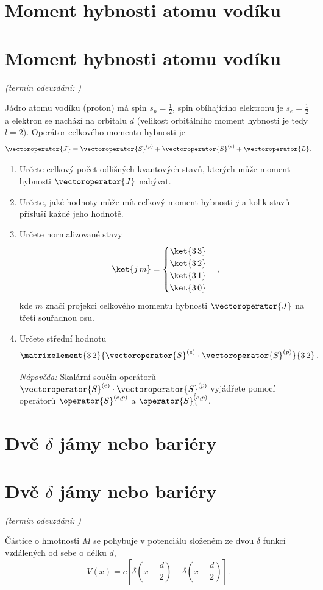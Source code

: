 \documentclass[a4paper,11pt,twoside]{book}
\def\np{\newpage}
\newcommand{\exercise}[2][]{\ifthenelse{\isempty{#1}}
	{\np\section{#2}}
	{\np\section{#2}\small{\it{(termín odevzdání: {#1})}\newline}}
}
\begin{document}
\exercise{Moment hybnosti atomu vodíku}
    Jádro atomu vodíku (proton) má spin $s_{p}=\frac{1}{2}$, spin obíhajícího elektronu je $s_{e}=\frac{1}{2}$ a elektron se nachází na orbitalu $d$ (velikost orbitálního moment hybnosti je tedy $l=2$).
    Operátor celkového momentu hybnosti je
    \begin{equation*}
        \vectoroperator{J}=\vectoroperator{S}^{(p)}+\vectoroperator{S}^{(e)}+\vectoroperator{L}.
    \end{equation*}
    
    \begin{enumerate}
    \item
        Určete celkový počet odlišných kvantových stavů, kterých může moment hybnosti $\vectoroperator{J}$ nabývat.
        
    \item
        Určete, jaké hodnoty může mít celkový moment hybnosti $j$ a kolik stavů přísluší každé jeho hodnotě.
        
    \item
        Určete normalizované stavy
        \begin{equation*}
            \ket{j\,m}=\begin{cases}\ket{3\,3} \\ \ket{3\,2} \\ \ket{3\,1} \\ \ket{3\,0}\end{cases},
        \end{equation*}
        kde $m$ značí projekci celkového momentu hybnosti $\vectoroperator{J}$ na třetí souřadnou osu.
        
    \item
        Určete střední hodnotu
        \begin{equation*}
            \matrixelement{3\,2}{\vectoroperator{S}^{(e)}\cdot\vectoroperator{S}^{(p)}}{3\,2}\,.
        \end{equation*}

\emph{Nápověda:}
    Skalární součin operátorů $\vectoroperator{S}^{(e)}\cdot\vectoroperator{S}^{(p)}$ vyjádřete pomocí
    operátorů $\operator{S}^{(e,p)}_{\pm}$ a $\operator{S}^{(e,p)}_{3}$.	
    \end{enumerate}

\exercise{Dvě $\delta$ jámy nebo bariéry}
    Částice o hmotnosti $M$ se pohybuje v potenciálu složeném ze dvou $\delta$ funkcí vzdálených od sebe o délku $d$,
    \begin{equation*}
        V(x)=c\left[\delta\left(x-\frac{d}{2}\right)+\delta\left(x+\frac{d}{2}\right)\right].
    \end{equation*}
    
\end{document}
